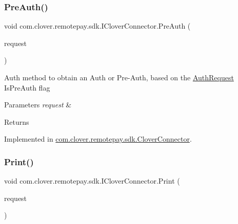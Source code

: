 \subsubsection{\texorpdfstring{Pre\+Auth()}{PreAuth()}}
{\footnotesize\ttfamily void com.\+clover.\+remotepay.\+sdk.\+I\+Clover\+Connector.\+Pre\+Auth (\begin{DoxyParamCaption}\item[{\hyperlink{classcom_1_1clover_1_1remotepay_1_1sdk_1_1_pre_auth_request}{Pre\+Auth\+Request}}]{request }\end{DoxyParamCaption})}



Auth method to obtain an Auth or Pre-\/\+Auth, based on the \hyperlink{classcom_1_1clover_1_1remotepay_1_1sdk_1_1_auth_request}{Auth\+Request} Is\+Pre\+Auth flag 


\begin{DoxyParams}{Parameters}
{\em request} & \\
\hline
\end{DoxyParams}
\begin{DoxyReturn}{Returns}

\end{DoxyReturn}


Implemented in \hyperlink{classcom_1_1clover_1_1remotepay_1_1sdk_1_1_clover_connector_ab770dbea796bfc3ffa1d0ed999d04b48}{com.\+clover.\+remotepay.\+sdk.\+Clover\+Connector}.

\mbox{\label{interfacecom_1_1clover_1_1remotepay_1_1sdk_1_1_i_clover_connector_a7145ff62e892d12f7461236bf67079c3}} 
\subsubsection{\texorpdfstring{Print()}{Print()}}
{\footnotesize\ttfamily void com.\+clover.\+remotepay.\+sdk.\+I\+Clover\+Connector.\+Print (\begin{DoxyParamCaption}\item[{\hyperlink{classcom_1_1clover_1_1remotepay_1_1sdk_1_1_print_request}{Print\+Request}}]{request }\end{DoxyParamCaption})}



